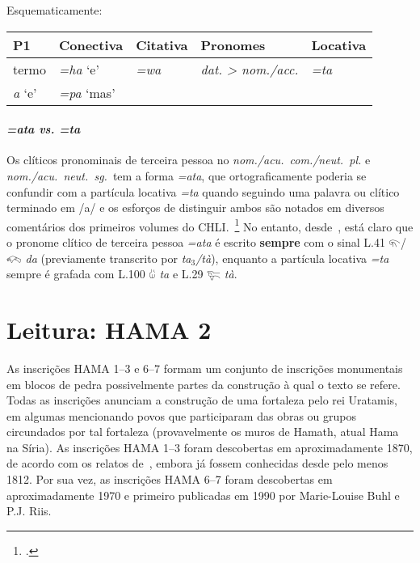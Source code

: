 Esquematicamente:

\begin{center}
	\begin{tabular}[c]{lllll}
		\toprule
		P1\emph{}    & Conectiva\emph{} & Citativa\emph{} & Pronomes\emph{}         & Locativa\emph{} \\
		\midrule
		\emph{}termo & \emph{=ha} `e'   & \emph{=wa}      & \emph{dat. > nom./acc.} & \emph{=ta}      \\
		\emph{a} `e' & \emph{=pa} `mas' & \emph{}         & \emph{}                 & \emph{}         \\
		\bottomrule
	\end{tabular}
\end{center}

\paragraph{\emph{=ata vs. =ta}}
Os clíticos pronominais de terceira pessoa no \emph{nom.\slash{}acu.\
	com.\slash{}neut.\ pl.} e \emph{nom.\slash{}acu.\ neut.\ sg.}\ tem a forma
\emph{=ata}, que ortograficamente poderia se confundir com a partícula locativa
\emph{=ta} quando seguindo uma palavra ou clítico terminado em /a/ e
os esforços de distinguir ambos são notados em diversos comentários dos
primeiros volumes do CHLI.~\footnote{\citet{CHLI11,CHLI12,CHLI13,CHLI2}.}
No entanto, desde~\citet{Rieken2008}, está claro que o pronome clítico de
terceira pessoa \emph{=ata} é escrito \textbf{sempre} com o sinal L.41
𔐬\slash{}𔐫 \emph{da} (previamente transcrito por \emph{ta$_3$\slash{}tà}),
enquanto a partícula locativa \emph{=ta} sempre é grafada com L.100 𔑰 \emph{ta} e
L.29 𔐞 \emph{tà}.


\section{Leitura: HAMA 2}

As inscrições HAMA 1--3 e 6--7 formam um conjunto de inscrições monumentais
em blocos de pedra possivelmente partes da construção à qual o texto se refere.
Todas as inscrições anunciam a construção de uma fortaleza pelo rei Uratamis, em
algumas mencionando povos que participaram das obras ou grupos circundados por
tal fortaleza (provavelmente os muros de Hamath, atual Hama na Síria).
As inscrições HAMA 1--3 foram descobertas em aproximadamente 1870, de acordo com
os relatos de~\citet[pp. 333ff.]{UnexploredSyriaI}, embora já fossem conhecidas
desde pelo menos 1812.
Por sua vez, as inscrições HAMA 6--7 foram descobertas em aproximadamente 1970 e
primeiro publicadas em 1990 por Marie-Louise Buhl e P.J. Riis.

